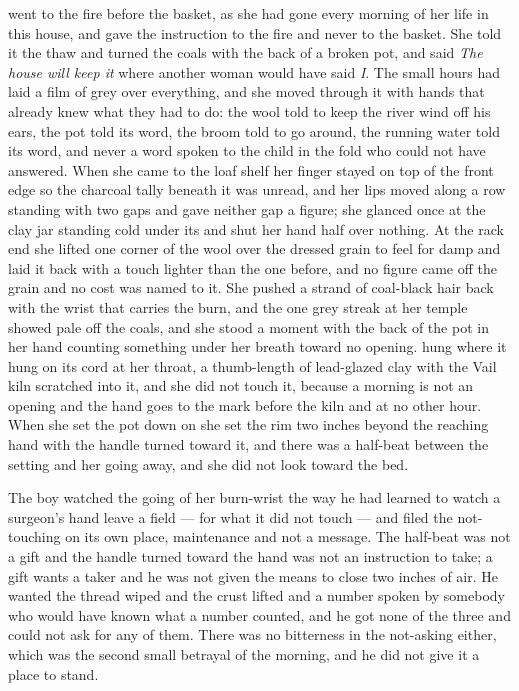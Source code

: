 \scenebreak

 went to the fire before the basket, as she had gone every morning of her life in this house, and gave the instruction to the fire and never to the basket. She told it the thaw and turned the coals with the back of a broken pot, and said \emph{The house will keep it} where another woman would have said \emph{I}. The small hours had laid a film of grey over everything, and she moved through it with hands that already knew what they had to do: the wool told to keep the river wind off his ears, the pot told its word, the broom told to go around, the running water told its word, and never a word spoken to the child in the fold who could not have answered. When she came to the loaf shelf her finger stayed on top of the front edge so the charcoal tally beneath it was unread, and her lips moved along a row standing with two gaps and gave neither gap a figure; she glanced once at the clay jar standing cold under its  and shut her hand half over nothing. At the rack end she lifted one corner of the wool over the dressed grain to feel for damp and laid it back with a touch lighter than the one before, and no figure came off the grain and no cost was named to it. She pushed a strand of coal-black hair back with the wrist that carries the burn, and the one grey streak at her temple showed pale off the coals, and she stood a moment with the back of the pot in her hand counting something under her breath toward no opening.  hung where it hung on its cord at her throat, a thumb-length of lead-glazed clay with the Vail kiln scratched into it, and she did not touch it, because a morning is not an opening and the hand goes to the mark before the kiln and at no other hour. When she set the pot down on  she set the rim two inches beyond the reaching hand with the handle turned toward it, and there was a half-beat between the setting and her going away, and she did not look toward the bed.

The boy watched the going of her burn-wrist the way he had learned to watch a surgeon's hand leave a field --- for what it did not touch --- and filed the not-touching on its own place, maintenance and not a message. The half-beat was not a gift and the handle turned toward the hand was not an instruction to take; a gift wants a taker and he was not given the means to close two inches of air. He wanted the thread wiped and the crust lifted and a number spoken by somebody who would have known what a number counted, and he got none of the three and could not ask for any of them. There was no bitterness in the not-asking either, which was the second small betrayal of the morning, and he did not give it a place to stand.

